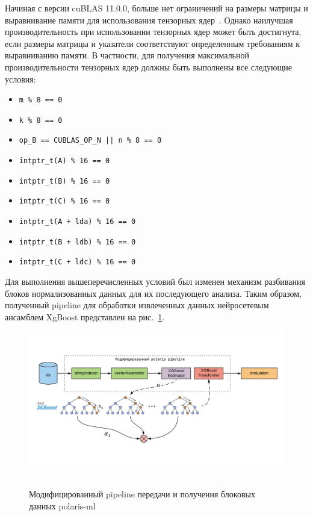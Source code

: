 \documentclass[14pt, a4paper]{../cls/coursework}
\begin{document}
    Начиная с версии cuBLAS 11.0.0, больше нет ограничений на размеры матрицы и выравнивание памяти для использования тензорных ядер~\cite{nvidia_cublas_docs}.
    Однако наилучшая производительность при использовании тензорных ядер может быть достигнута, если размеры матрицы и указатели соответствуют определенным требованиям к выравниванию памяти.
    В частности, для получения максимальной производительности тензорных ядер должны быть выполнены все следующие условия:

    \begin{itemize}
        \item \texttt{m \% 8 == 0}
        \item \texttt{k \% 8 == 0}
        \item \texttt{op\_B == CUBLAS\_OP\_N || n \% 8 == 0}
        \item \texttt{intptr\_t(A) \% 16 == 0}
        \item \texttt{intptr\_t(B) \% 16 == 0}
        \item \texttt{intptr\_t(C) \% 16 == 0}
        \item \texttt{intptr\_t(A + lda) \% 16 == 0}
        \item \texttt{intptr\_t(B + ldb) \% 16 == 0}
        \item \texttt{intptr\_t(C + ldc) \% 16 == 0}
    \end{itemize}

    Для выполнения вышеперечисленных условий был изменен механизм разбивания блоков нормализованных данных для их последующего анализа.
    Таким образом, полученный pipeline для обработки извлеченных данных нейросетевым ансамблем XgBoost представлен на рис.~\ref{fig:polaris_xgboost_pipeline}.

    \begin{figure}[!htbp]
        \centering
        \includegraphics[width=1.0\textwidth]{polaris_xgboost_pipeline}
        ~\caption{Модифицированный pipeline передачи и получения блоковых данных polaris-ml}
        \label{fig:polaris_xgboost_pipeline}
    \end{figure}
\end{document}
